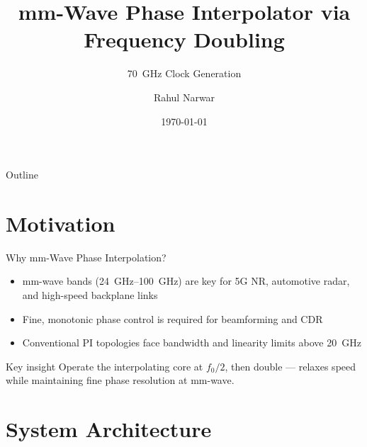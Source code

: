 \documentclass[10pt, aspectratio=169]{beamer}
\title{mm-Wave Phase Interpolator via Frequency Doubling}
\subtitle{\texorpdfstring{\SI{70}{\giga\hertz}}{70 GHz} Clock Generation}
\author{Rahul Narwar}
\date{\today}
\institute{HIE Lab, University of California, Irvine}
\begin{document}
\maketitle

\begin{frame}{Outline}
  \tableofcontents
\end{frame}

\section{Motivation}

\begin{frame}{Why mm-Wave Phase Interpolation?}
  \begin{itemize}
    \item mm-wave bands (\SIrange{24}{100}{\giga\hertz}) are key for 5G NR,
          automotive radar, and high-speed backplane links
    \item Fine, monotonic phase control is required for beamforming and CDR
    \item Conventional PI topologies face bandwidth and linearity limits above
          \SI{20}{\giga\hertz}
  \end{itemize}
  \begin{block}{Key insight}
    Operate the interpolating core at $f_0/2$, then double —
    relaxes speed while maintaining fine phase resolution at mm-wave.
  \end{block}
\end{frame}

\section{System Architecture}
\end{document}
